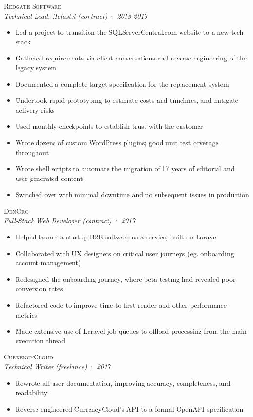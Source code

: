 \documentclass[a4paper,10pt]{article}
\newcommand{\resumeSubheading}[5][12pt]{
  \vspace{#1}
  {\scshape{#2}} \\
  \textit{\small{#3}} \textit{\small{(#4)}} · \textit{\small{#5}}
  \vspace{2pt}
}
\newcommand{\resumeListStart}{\begin{itemize}}
\newcommand{\resumeListEnd}{\end{itemize}}
\newcommand{\resumeItem}[1]{
  \item[\-·]\small{{#1\vspace{1pt}}}
}
\begin{document}
  \begin{minipage}{\textwidth}
    \resumeSubheading
      {Redgate Software}
      {Technical Lead, Helastel}
      {contract}
      {2018-2019}
    \resumeListStart
      \resumeItem{Led a project to transition the SQLServerCentral.com website to a new tech stack}
      \resumeItem{Gathered requirements via client conversations and reverse engineering of the legacy system}
      \resumeItem{Documented a complete target specification for the replacement system}
      \resumeItem{Undertook rapid prototyping to estimate costs and timelines, and mitigate delivery risks}
      \resumeItem{Used monthly checkpoints to establish trust with the customer}
      \resumeItem{Wrote dozens of custom WordPress plugins; good unit test coverage throughout}
      \resumeItem{Wrote shell scripts to automate the migration of 17 years of editorial and user-generated content}
      \resumeItem{Switched over with minimal downtime and no subsequent issues in production}
    \resumeListEnd
  \end{minipage}


  \begin{minipage}{\textwidth}
    \resumeSubheading
      {DenGro}
      {Full-Stack Web Developer}
      {contract}
      {2017}
    \resumeListStart
      \resumeItem{Helped launch a startup B2B software-as-a-service, built on Laravel}
      \resumeItem{Collaborated with UX designers on critical user journeys (eg. onboarding, account management)}
      \resumeItem{Redesigned the onboarding journey, where beta testing had revealed poor conversion rates}
      \resumeItem{Refactored code to improve time-to-first render and other performance metrics}
      \resumeItem{Made extensive use of Laravel job queues to offload processing from the main execution thread}
    \resumeListEnd
  \end{minipage}

  \begin{minipage}{\textwidth}
    \resumeSubheading
      {CurrencyCloud}
      {Technical Writer}
      {freelance}
      {2017}
    \resumeListStart
      \resumeItem{Rewrote all user documentation, improving accuracy, completeness, and readability}
      \resumeItem{Reverse engineered CurrencyCloud's API to a formal OpenAPI specification}
    \resumeListEnd
  \end{minipage}
\end{document}
